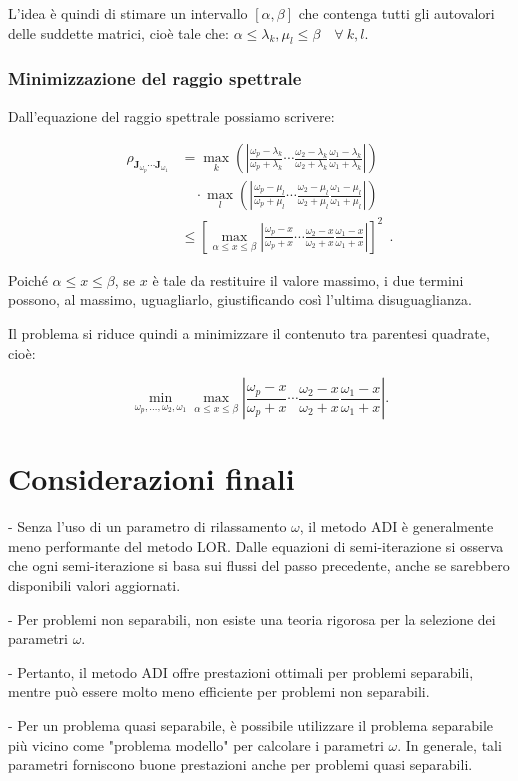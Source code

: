 L'idea è quindi di stimare un intervallo \([\alpha, \beta]\) che contenga tutti gli autovalori delle suddette matrici, cioè tale che: $\alpha \leq \lambda_k, \mu_l \leq \beta \quad \forall\ k, l$.



\subsubsection{Minimizzazione del raggio spettrale}

Dall'equazione del raggio spettrale possiamo scrivere:

\[
\begin{aligned}
	\rho_{\mathbf{J}_{\omega_p} \cdots \mathbf{J}_{\omega_1}} &= \max_k \left( \left| \frac{\omega_p - \lambda_k}{\omega_p + \lambda_k} \cdots \frac{\omega_2 - \lambda_k}{\omega_2 + \lambda_k} \frac{\omega_1 - \lambda_k}{\omega_1 + \lambda_k} \right| \right) \\
	&\quad \cdot \max_l \left( \left| \frac{\omega_p - \mu_l}{\omega_p + \mu_l} \cdots \frac{\omega_2 - \mu_l}{\omega_2 + \mu_l} \frac{\omega_1 - \mu_l}{\omega_1 + \mu_l} \right| \right) \\
	&\leq \left[ \max_{\alpha \leq x \leq \beta} \left| \frac{\omega_p - x}{\omega_p + x} \cdots \frac{\omega_2 - x}{\omega_2 + x} \frac{\omega_1 - x}{\omega_1 + x} \right| \right]^2\ \ . 
\end{aligned}
\]

Poiché \(\alpha \leq x \leq \beta\), se \(x\) è tale da restituire il valore massimo, i due termini possono, al massimo, uguagliarlo, giustificando così l'ultima disuguaglianza.

Il problema si riduce quindi a minimizzare il contenuto tra parentesi quadrate, cioè:

\[
\min_{\omega_p, \dots, \omega_2, \omega_1} \max_{\alpha \leq x \leq \beta} \left| \frac{\omega_p - x}{\omega_p + x} \cdots \frac{\omega_2 - x}{\omega_2 + x} \frac{\omega_1 - x}{\omega_1 + x} \right|. \tag{24}
\]


\section{Considerazioni finali}

- Senza l'uso di un parametro di rilassamento \(\omega\), il metodo ADI è generalmente meno performante del metodo LOR. Dalle equazioni di semi-iterazione si osserva che ogni semi-iterazione si basa sui flussi del passo precedente, anche se sarebbero disponibili valori aggiornati.

- Per problemi non separabili, non esiste una teoria rigorosa per la selezione dei parametri \(\omega\).

- Pertanto, il metodo ADI offre prestazioni ottimali per problemi separabili, mentre può essere molto meno efficiente per problemi non separabili.

- Per un problema quasi separabile, è possibile utilizzare il problema separabile più vicino come "problema modello" per calcolare i parametri \(\omega\). In generale, tali parametri forniscono buone prestazioni anche per problemi quasi separabili.